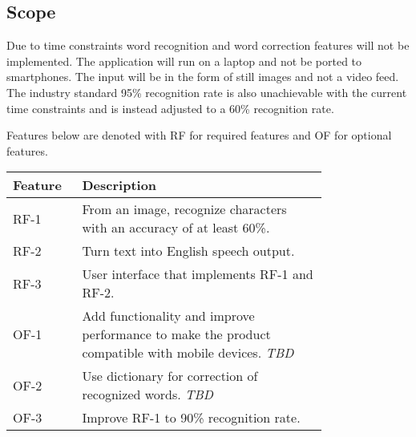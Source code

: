\documentclass[../main.tex]{subfiles}
\begin{document}
\subsection{Scope}
Due to time constraints word recognition and word correction features will not
be implemented. The application will run on a laptop and not be ported to
smartphones. The input will be in the form of still images and not a video
feed. The industry standard 95\% recognition rate is also unachievable with
the current time constraints and is instead adjusted to a 60\% recognition
rate.

Features below are denoted with RF for required features and OF for optional
features.
  \noindent\begin{tabularx}{\linewidth}{X p{0.78\linewidth}}
  \toprule
    \textbf{Feature} & \textbf{Description} \\
  \midrule
  RF-1 &
    From an image, recognize characters with an accuracy of at least 60\%. \\
  RF-2 &
    Turn text into English speech output. \\
  RF-3 &
    User interface that implements RF-1 and RF-2. \\
  OF-1 &
    Add functionality and improve performance to make the product compatible
    with mobile devices. \textit{TBD} \\
  OF-2 &
    Use dictionary for correction of recognized words. \textit{TBD} \\
  OF-3 &
    Improve RF-1 to 90\% recognition rate. \\
  \bottomrule
  \end{tabularx}
\end{document}
